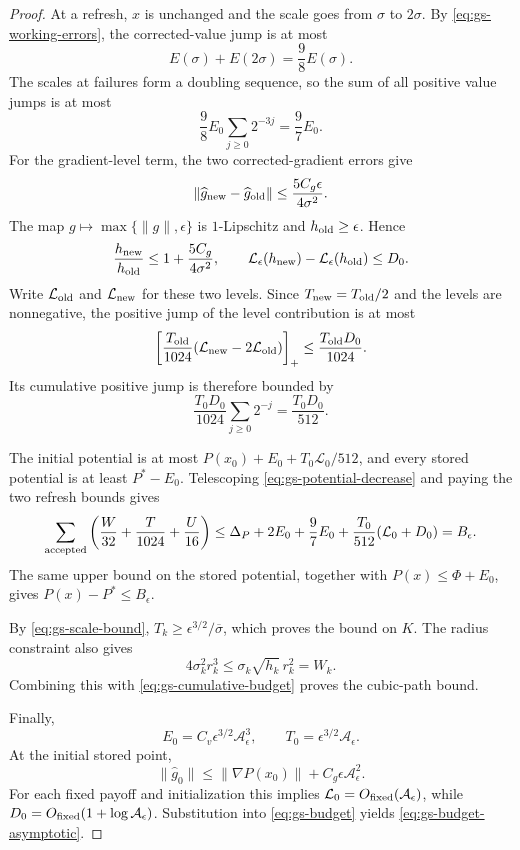 \documentclass{article}
\begin{document}
\begin{proof}
At a refresh, $x$ is unchanged and the scale goes from $\sigma$ to
$2\sigma$.  By \eqref{eq:gs-working-errors}, the corrected-value jump
is at most
\[
 E(\sigma)+E(2\sigma)=\frac98E(\sigma).
\]
The scales at failures form a doubling sequence, so the sum of all
positive value jumps is at most
\[
 \frac98E_0\sum_{j\ge0}2^{-3j}=\frac97E_0.
\]
For the gradient-level term, the two corrected-gradient errors give
\[
 \|\widehat g_{\rm new}-\widehat g_{\rm old}\|
 \le\frac{5C_g\epsilon}{4\sigma^2}.
\]
The map $g\mapsto\max\{\|g\|,\epsilon\}$ is $1$-Lipschitz and
$h_{\rm old}\ge\epsilon$.  Hence
\[
 \frac{h_{\rm new}}{h_{\rm old}}
 \le1+\frac{5C_g}{4\sigma^2},
 \qquad
 \mathcal L_\epsilon(h_{\rm new})
       -\mathcal L_\epsilon(h_{\rm old})\le D_0.
\]
Write $\mathcal L_{\rm old}$ and $\mathcal L_{\rm new}$ for these
two levels.  Since $T_{\rm new}=T_{\rm old}/2$ and the levels are
nonnegative, the positive jump of the level contribution is at most
\[
 \left[
  \frac{T_{\rm old}}{1024}
  (\mathcal L_{\rm new}-2\mathcal L_{\rm old})
 \right]_+
 \le\frac{T_{\rm old}D_0}{1024}.
\]
Its cumulative positive jump is therefore bounded by
\[
 \frac{T_0D_0}{1024}\sum_{j\ge0}2^{-j}
 =\frac{T_0D_0}{512}.
\]

The initial potential is at most
$P(x_0)+E_0+T_0\mathcal L_0/512$, and every stored potential is at
least $P^*-E_0$.  Telescoping \eqref{eq:gs-potential-decrease} and
paying the two refresh bounds gives
\[
 \sum_{\rm accepted}
 \left(\frac W{32}+\frac T{1024}+\frac U{16}\right)
 \le\Delta_P+2E_0+\frac97E_0
       +\frac{T_0}{512}(\mathcal L_0+D_0)=B_\epsilon.
\]
The same upper bound on the stored potential, together with
$P(x)\le\Phi+E_0$, gives $P(x)-P^*\le B_\epsilon$.

By \eqref{eq:gs-scale-bound},
$T_k\ge\epsilon^{3/2}/\overline\sigma$, which proves the bound on $K$.
The radius constraint also gives
\[
 4\sigma_k^2r_k^3\le\sigma_k\sqrt{h_k}\,r_k^2=W_k.
\]
Combining this with \eqref{eq:gs-cumulative-budget} proves the
cubic-path bound.

Finally,
\[
 E_0=C_v\epsilon^{3/2}\mathcal A_\epsilon^3,
 \qquad T_0=\epsilon^{3/2}\mathcal A_\epsilon.
\]
At the initial stored point,
\[
 \|\widehat g_0\|
 \le\|\nabla P(x_0)\|+C_g\epsilon\mathcal A_\epsilon^2.
\]
For each fixed payoff and initialization this implies
$\mathcal L_0=O_{\rm fixed}(\mathcal A_\epsilon)$, while
$D_0=O_{\rm fixed}(1+\log\mathcal A_\epsilon)$.
Substitution into \eqref{eq:gs-budget} yields
\eqref{eq:gs-budget-asymptotic}.
\end{proof}
\end{document}
